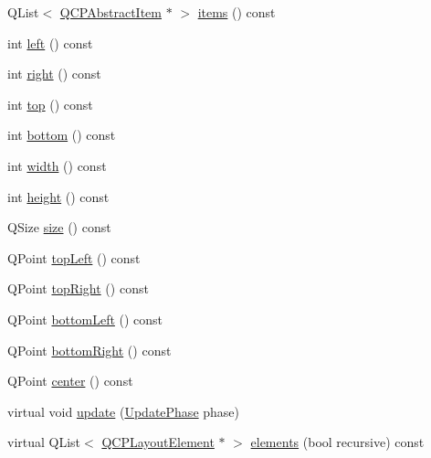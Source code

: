 \begin{DoxyCompactItemize}
Q\+List$<$ \hyperlink{classQCPAbstractItem}{Q\+C\+P\+Abstract\+Item} $\ast$ $>$ \hyperlink{classQCPAxisRect_a0f17ed539962cfcbaca8ce0b1776c840}{items} () const 
\item 
int \hyperlink{classQCPAxisRect_a55b3ecf72a3a65b053f7651b88db458d}{left} () const 
\item 
int \hyperlink{classQCPAxisRect_a6d0f989fc552aa2b563cf82f8fc81e61}{right} () const 
\item 
int \hyperlink{classQCPAxisRect_ac45aef1eb75cea46b241b6303028a607}{top} () const 
\item 
int \hyperlink{classQCPAxisRect_af2b5982ebe7e6f781b9bf1cc371a60d8}{bottom} () const 
\item 
int \hyperlink{classQCPAxisRect_a45bf5c17f4ca29131b7eb0db06efc259}{width} () const 
\item 
int \hyperlink{classQCPAxisRect_a1c55c4f3bef40cf01b21820316c8469e}{height} () const 
\item 
Q\+Size \hyperlink{classQCPAxisRect_a871b9fe49e92b39a3cbe29a59e458536}{size} () const 
\item 
Q\+Point \hyperlink{classQCPAxisRect_a88acbe716bcf5072790a6f95637c40d8}{top\+Left} () const 
\item 
Q\+Point \hyperlink{classQCPAxisRect_a232409546394c23b59407bc62fa460a8}{top\+Right} () const 
\item 
Q\+Point \hyperlink{classQCPAxisRect_a724b0333971ea6a338f0dbd814dc97ae}{bottom\+Left} () const 
\item 
Q\+Point \hyperlink{classQCPAxisRect_a49ea3c7dff834b47e266cbf3d79f78b9}{bottom\+Right} () const 
\item 
Q\+Point \hyperlink{classQCPAxisRect_aea5e6042bca198424fa1bc02fc282e59}{center} () const 
\item 
virtual void \hyperlink{classQCPAxisRect_a255080a017df9083a60a321ef2ba9ed8}{update} (\hyperlink{classQCPLayoutElement_a0d83360e05735735aaf6d7983c56374d}{Update\+Phase} phase)
\item 
virtual Q\+List$<$ \hyperlink{classQCPLayoutElement}{Q\+C\+P\+Layout\+Element} $\ast$ $>$ \hyperlink{classQCPAxisRect_a2bda6bf2b5b5797f92583cecd01c8949}{elements} (bool recursive) const 
\end{DoxyCompactItemize}
